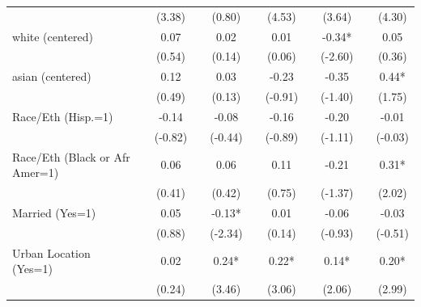 {\begin{tabular*}{\hsize}{@{\hskip\tabcolsep\extracolsep\fill}l*{10}{c}}
                    &             &      (3.38) &             &      (0.80) &             &      (4.53) &             &      (3.64) &             &      (4.30) \\
white (centered)    &             &        0.07 &             &        0.02 &             &        0.01 &             &       -0.34*&             &        0.05 \\
                    &             &      (0.54) &             &      (0.14) &             &      (0.06) &             &     (-2.60) &             &      (0.36) \\
asian (centered)    &             &        0.12 &             &        0.03 &             &       -0.23 &             &       -0.35 &             &        0.44*\\
                    &             &      (0.49) &             &      (0.13) &             &     (-0.91) &             &     (-1.40) &             &      (1.75) \\
Race/Eth (Hisp.=1)  &             &       -0.14 &             &       -0.08 &             &       -0.16 &             &       -0.20 &             &       -0.01 \\
                    &             &     (-0.82) &             &     (-0.44) &             &     (-0.89) &             &     (-1.11) &             &     (-0.03) \\
Race/Eth (Black or Afr Amer=1)&             &        0.06 &             &        0.06 &             &        0.11 &             &       -0.21 &             &        0.31*\\
                    &             &      (0.41) &             &      (0.42) &             &      (0.75) &             &     (-1.37) &             &      (2.02) \\
Married (Yes=1)     &             &        0.05 &             &       -0.13*&             &        0.01 &             &       -0.06 &             &       -0.03 \\
                    &             &      (0.88) &             &     (-2.34) &             &      (0.14) &             &     (-0.93) &             &     (-0.51) \\
Urban Location (Yes=1)&             &        0.02 &             &        0.24*&             &        0.22*&             &        0.14*&             &        0.20*\\
                    &             &      (0.24) &             &      (3.46) &             &      (3.06) &             &      (2.06) &             &      (2.99) \\

\end{tabular*}}
